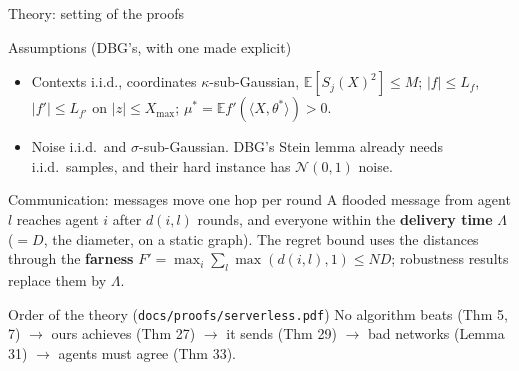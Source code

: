 \documentclass[11pt]{beamer}
\begin{document}
\begin{frame}{Theory: setting of the proofs}
\footnotesize
\begin{block}{Assumptions (DBG's, with one made explicit)}
\begin{itemize}
\item Contexts i.i.d., coordinates $\kappa$-sub-Gaussian, $\mathbb E[S_j(X)^2]\le M$; $|f|\le L_f$, $|f'|\le L_{f'}$ on $|z|\le X_{\max}$; $\mu^*=\mathbb E f'(\langle X,\theta^*\rangle)>0$.
\item Noise i.i.d.\ and $\sigma$-sub-Gaussian. DBG's Stein lemma already needs i.i.d.\ samples, and their hard instance has $\mathcal N(0,1)$ noise.
\end{itemize}
\end{block}
\begin{block}{Communication: messages move one hop per round}
A flooded message from agent $l$ reaches agent $i$ after $d(i,l)$ rounds, and everyone within the \textbf{delivery time} $\Lambda$ ($=D$, the diameter, on a static graph). The regret bound uses the distances through the \textbf{farness} $F'=\max_i\sum_l\max(d(i,l),1)\le ND$; robustness results replace them by $\Lambda$.
\end{block}
\begin{block}{Order of the theory (\texttt{docs/proofs/serverless.pdf})}
No algorithm beats (Thm 5, 7) $\to$ ours achieves (Thm 27) $\to$ it sends (Thm 29) $\to$ bad networks (Lemma 31) $\to$ agents must agree (Thm 33).
\end{block}
\end{frame}
\end{document}
